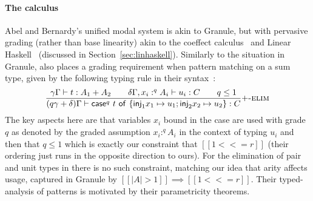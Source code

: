  \paragraph{The \abname{} calculus}
 Abel and Bernardy's unified modal system \abname{} is akin to Granule,
 but with pervasive grading (rather than base linearity) akin to the
 coeffect calculus~\cite{petricek2014coeffects} and Linear
 Haskell~\cite{linear-haskell} (discussed in
 Section~\ref{sec:linhaskell}). Similarly to the situation in Granule,
 \abname{} also places a grading requirement when pattern matching on a
 sum type, given by the following typing rule in their syntax~\cite[Fig
 1, p.4]{abel-barnardy-icfp2020}:
 \begin{align*}
 \dfrac{\gamma \Gamma \vdash t : A_1 + A_2 \qquad \delta\Gamma, x_i :^q
   A_i \vdash u_i : C \qquad q \leq 1}
       {(q\gamma + \delta)\Gamma \vdash \mathsf{case}^q\ t\ \mathsf{of}\
   \{\mathsf{inj}_1 x_1 \mapsto u_1; \mathsf{inj}_2 x_2 \mapsto u_2 \}
   : C}\textsc{$+$-elim}
 \end{align*}
 The key aspects here are that variables $x_i$ bound in the case are used
 with grade $q$ as denoted by the graded assumption $x_i :^q A_i$ in the context of
 typing $u_i$ and then that $q \leq 1$ which is exactly our
 constraint that $[[ 1 <<= r ]]$ (their ordering just runs in the
 opposite direction to ours). For the elimination of pair and unit
 types in \abname{} there is no such constraint, matching our idea that arity
 affects usage, captured in Granule by $[[ | A | > 1 ]] \implies [[ 1
 <<= r ]]$. Their typed-analysis of patterns is motivated
 by their parametricity theorems.
 
